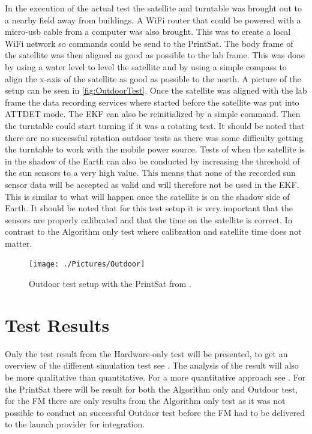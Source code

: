 In the execution of the actual test the satellite and turntable was brought out to a nearby field away from buildings. A WiFi router that could be powered with a micro-usb cable from a computer was also brought. This was to create a local WiFi network so commands could be send to the PrintSat. The body frame of the satellite was then aligned as good as possible to the lab frame. This was done by using a water level to level the satellite and by using a simple compass to align the x-axis of the satellite as good as possible to the north. A picture of the setup can be seen in \autoref{fig:OutdoorTest}. Once the satellite was aligned with the lab frame the data recording services where started before the satellite was put into ATTDET mode. The EKF can also be reinitialized by a simple command. Then the turntable could start turning if it was a rotating test. It should be noted that there are no successful rotation outdoor tests as there was some difficulty getting the turntable to work with the mobile power source. Tests of when the satellite is in the shadow of the Earth can also be conducted by increasing the threshold of the sun sensors to a very high value. This means that none of the recorded sun sensor data will be accepted as valid and will therefore not be used in the EKF. This is similar to what will happen once the satellite is on the shadow side of Earth. It should be noted that for this test setup it is very important that the sensors are properly calibrated and that the time on the satellite is correct. In contrast to the Algorithm only test where calibration and satellite time does not matter.

\begin{figure}[tbp]
	\centering
	\texttt{[image: ./Pictures/Outdoor]}
	\caption{Outdoor test setup with the PrintSat from \cite{DavidThesis}.}
	\label{fig:OutdoorTest}
\end{figure}

\ifdraft
\section{Test Results}
Only the test result from the Hardware-only test will be presented, to get an overview of the different simulation test see \cite{DavidThesis}. The analysis of the result will also be more qualitative than quantitative. For a more quantitative approach see \cite{DavidThesis}. For the PrintSat there will be result for both the Algorithm only and Outdoor test, for the FM there are only results from the Algorithm only test as it was not possible to conduct an successful Outdoor test before the FM had to be delivered to the launch provider for integration. 

